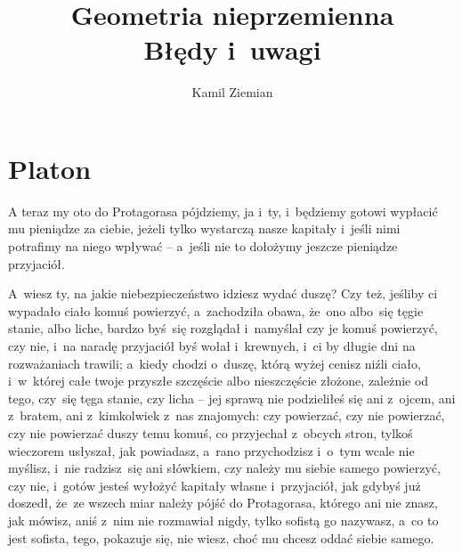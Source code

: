 \documentclass[a4paper,11pt]{article}
\title{Geometria nieprzemienna \\
  Błędy i~uwagi}
\author{Kamil Ziemian}
\begin{document}





\maketitle %





\section{Platon}





\noindent
A teraz my oto do Protagorasa pójdziemy, ja i~ty, i~będziemy
gotowi wypłacić mu pieniądze za ciebie, jeżeli tylko wystarczą nasze
kapitały i~jeśli nimi potrafimy na niego wpływać -- a~jeśli nie to
dołożymy jeszcze pieniądze przyjaciół.


\vspace{\spaceThree}



\noindent
A~wiesz ty, na jakie niebezpieczeństwo idziesz wydać duszę? Czy
też, jeśliby ci wypadało ciało komuś powierzyć, a~zachodziła obawa,
że~ono albo~się tęgie stanie, albo liche, bardzo byś~się rozglądał
i~namyślał czy je komuś powierzyć, czy nie, i~na naradę przyjaciół byś
wołał i~krewnych, i~ci by długie dni na rozważaniach trawili; a~kiedy
chodzi o~duszę, którą wyżej cenisz niźli ciało, i~w~której całe twoje
przyszłe szczęście albo nieszczęście złożone, zależnie od tego,
czy~się tęga stanie, czy licha -- jej sprawą nie podzieliłeś się ani
z~ojcem, ani z~bratem, ani z~kimkolwiek z~nas znajomych: czy
powierzać, czy nie powierzać, czy nie powierzać duszy temu komuś, co
przyjechał z~obcych stron, tylkoś wieczorem usłyszał, jak powiadasz,
a~rano przychodzisz i~o~tym wcale nie myślisz, i~nie radzisz~się ani
słówkiem, czy należy mu siebie samego powierzyć, czy nie, i~gotów
jesteś wyłożyć kapitały własne i~przyjaciół, jak gdybyś już doszedł,
że~ze wszech miar należy pójść do Protagorasa, którego ani nie znasz,
jak mówisz, aniś z~nim nie rozmawiał nigdy, tylko sofistą go nazywasz,
a~co to jest sofista, tego, pokazuje się, nie wiesz, choć mu chcesz
oddać siebie samego.
\end{document}
